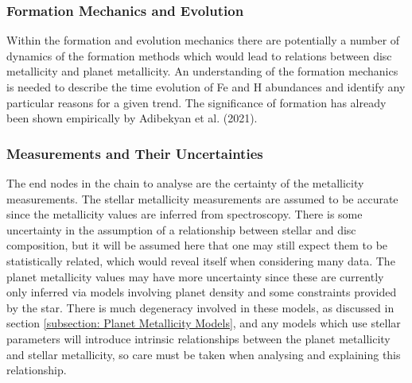 \documentclass[a4paper,twocolumn,12pt]{article}
\begin{document}


\subsubsection{Formation Mechanics and Evolution}
Within the formation and evolution mechanics there are potentially a number of dynamics of the formation methods which would lead to relations between disc metallicity and planet metallicity. An understanding of the formation mechanics is needed to describe the time evolution of Fe and H abundances and identify any particular reasons for a given trend. The significance of formation has already been shown empirically by Adibekyan et al. (2021).



\subsubsection{Measurements and Their Uncertainties}
The end nodes in the chain to analyse are the certainty of the metallicity measurements. The stellar metallicity measurements are assumed to be accurate since the metallicity values are inferred from spectroscopy. There is some uncertainty in the assumption of a relationship between stellar and disc composition, but it will be assumed here that one may still expect them to be statistically related, which would reveal itself when considering many data. The planet metallicity values may have more uncertainty since these are currently only inferred via models involving planet density and some constraints provided by the star. There is much degeneracy involved in these models, as discussed in section \ref{subsection: Planet Metallicity Models}, and any models which use stellar parameters will introduce intrinsic relationships between the planet metallicity and stellar metallicity, so care must be taken when analysing and explaining this relationship.
\end{document}
